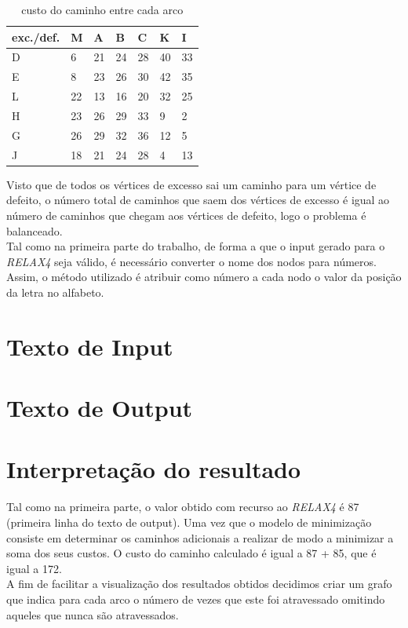 \documentclass[a4paper]{report}
\begin{document}
\begin{table}[H]
\centering
\begin{tabular}{|l|l|l|l|l|l|l|}
\hline
exc./def. & M  & A  & B  & C  & K  & I  \\ \hline
D         & 6  & 21 & 24 & 28 & 40 & 33 \\ \hline
E         & 8  & 23 & 26 & 30 & 42 & 35 \\ \hline
L         & 22 & 13 & 16 & 20 & 32 & 25 \\ \hline
H         & 23 & 26 & 29 & 33 & 9  & 2  \\ \hline
G         & 26 & 29 & 32 & 36 & 12 & 5  \\ \hline
J         & 18 & 21 & 24 & 28 & 4  & 13 \\ \hline 
\end{tabular}
\caption{custo do caminho entre cada arco}
\end{table}
Visto que de todos os vértices de excesso sai um caminho para um vértice de
defeito, o número total de caminhos que saem dos vértices de excesso é igual ao
número de caminhos que chegam aos vértices de defeito, logo o problema é
balanceado.\\
Tal como na primeira parte do trabalho, de forma a que o input gerado para o
\textit{RELAX4} seja válido, é necessário converter o nome dos nodos para
números. Assim, o método utilizado é atribuir como número a cada nodo o valor da
posição da letra no alfabeto.

\pagebreak
\section{Texto de Input}
\label{input2}


\pagebreak
\section{Texto de Output}
\label{output2}


\pagebreak
\section{Interpretação do resultado}
\label{solution}
Tal como na primeira parte, o valor obtido com recurso ao \textit{RELAX4} é 87
(primeira linha do texto de output). Uma vez que o modelo de minimização
consiste em determinar os caminhos adicionais a realizar de modo a minimizar a
soma dos seus custos. O custo do caminho calculado é igual a 87 + 85, que é
igual a 172.\\
A fim de facilitar a visualização dos resultados obtidos decidimos criar um
grafo que indica para cada arco o número de vezes que este foi atravessado
omitindo aqueles que nunca são atravessados.
\end{document}
